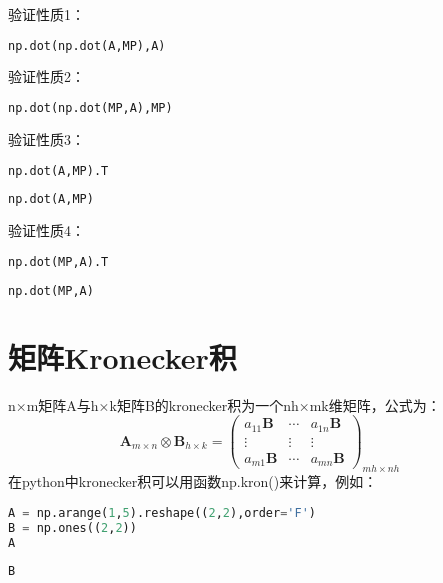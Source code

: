 \documentclass[UTF8,a4paper,12pt]{ctexart}  %
\begin{document}
验证性质1：

\begin{lstlisting}[language=Python]
np.dot(np.dot(A,MP),A)
\end{lstlisting}

验证性质2：

\begin{lstlisting}[language=Python]
np.dot(np.dot(MP,A),MP)
\end{lstlisting}

验证性质3：

\begin{lstlisting}[language=Python]
np.dot(A,MP).T
\end{lstlisting}

\begin{lstlisting}[language=Python]
np.dot(A,MP)
\end{lstlisting}

验证性质4：

\begin{lstlisting}[language=Python]
np.dot(MP,A).T
\end{lstlisting}

\begin{lstlisting}[language=Python]
np.dot(MP,A)
\end{lstlisting}

\hypertarget{kronecker}{%
\section{矩阵Kronecker积}\label{kronecker}}

n×m矩阵A与h×k矩阵B的kronecker积为一个nh×mk维矩阵，公式为：
\[
\mathbf{A}_{m \times n} \otimes \mathbf{B}_{h \times k}=\left(\begin{array}{ccc}
a_{11} \mathbf{B} & \cdots & a_{1 n} \mathbf{B} \\
\vdots & \vdots & \vdots \\
a_{m 1} \mathbf{B} & \cdots & a_{m n} \mathbf{B}
\end{array}\right)_{m h \times nh }
\]
在python中kronecker积可以用函数np.kron()来计算，例如：

\begin{lstlisting}[language=Python]
A = np.arange(1,5).reshape((2,2),order='F')
B = np.ones((2,2))
A
\end{lstlisting}

\begin{lstlisting}[language=Python]
B
\end{lstlisting}
\end{document}
